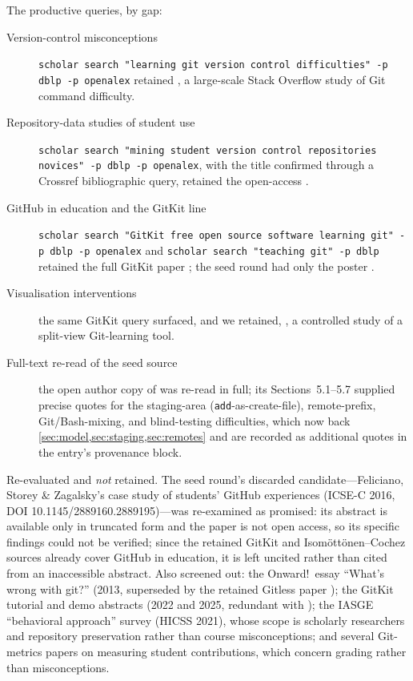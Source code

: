 The productive queries, by gap:
\begin{description}
  \item[Version-control misconceptions] \texttt{scholar search "learning git
    version control difficulties" -p dblp -p openalex} retained
    \autocite{Yang2022GitCommands}, a large-scale Stack Overflow study of Git
    command difficulty.
  \item[Repository-data studies of student use] \texttt{scholar search
    "mining student version control repositories novices" -p dblp -p
    openalex}, with the title confirmed through a Crossref bibliographic
    query, retained the open-access \autocite{Cochez2013DVCSUsage}.
  \item[GitHub in education and the GitKit line] \texttt{scholar search
    "GitKit free open source software learning git" -p dblp -p openalex} and
    \texttt{scholar search "teaching git" -p dblp} retained the full GitKit
    paper \autocite{Braught2024GitKit}; the seed round had only the poster
    \autocite{Postner2026GitMisconceptions}.
  \item[Visualisation interventions] the same GitKit query surfaced, and we
    retained, \autocite{Bucher2026GitTakesTwo}, a controlled study of a
    split-view Git-learning tool.
  \item[Full-text re-read of the seed source] the open author copy of
    \autocite{IsomottonenCochez2014} was re-read in full; its
    Sections~5.1--5.7 supplied precise quotes for the staging-area
    (\texttt{add}-as-create-file), remote-prefix, Git/Bash-mixing, and
    blind-testing difficulties, which now back
    \cref{sec:model,sec:staging,sec:remotes} and are recorded as additional
    quotes in the entry's provenance block.
\end{description}

Re-evaluated and \emph{not} retained.
The seed round's discarded candidate---Feliciano, Storey \& Zagalsky's case
study of students' GitHub experiences (ICSE-C 2016, DOI
10.1145/2889160.2889195)---was re-examined as promised: its abstract is
available only in truncated form and the paper is not open access, so its
specific findings could not be verified; since the retained GitKit and
Isomöttönen--Cochez sources already cover GitHub in education, it is left
uncited rather than cited from an inaccessible abstract.
Also screened out: the Onward!\ essay \enquote{What's wrong with git?} (2013,
superseded by the retained Gitless paper \autocite{DeRossoJackson2016Gitless});
the GitKit tutorial and demo abstracts (2022 and 2025, redundant with
\autocite{Braught2024GitKit}); the IASGE \enquote{behavioral approach} survey
(HICSS 2021), whose scope is scholarly researchers and repository
preservation rather than course misconceptions; and several Git-metrics
papers on measuring student contributions, which concern grading rather than
misconceptions.

